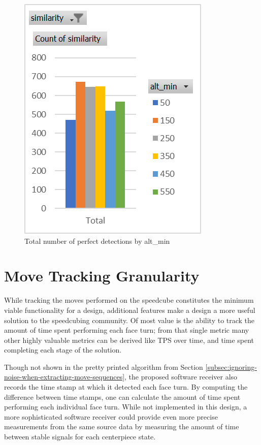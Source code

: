\begin{figure}[h]
    \centering
    \caption{Total number of perfect detections by alt\_min}
    \label{fig:perfect-detections-by-alt-min}
    \includegraphics[width=0.75\linewidth]{Figures/7 Evaluation/perfect_detections_by_alt_min.png}
\end{figure}


\section{Move Tracking Granularity}
\label{sec:move-tracking-granularity}

While tracking the moves performed on the speedcube constitutes the
minimum viable functionality for a design, additional features make a
design a more useful solution to the speedcubing community. Of most
value is the ability to track the amount of time spent performing each
face turn; from that single metric many other highly valuable metrics
can be derived like TPS over time, and time spent completing each stage
of the solution.

Though not shown in the pretty printed algorithm from Section
\ref{subsec:ignoring-noise-when-extracting-move-sequences}, the
proposed software receiver also records the time stamp at which it
detected each face turn. By computing the difference between time
stamps, one can calculate the amount of time spent performing each
individual face turn. While not implemented in this design, a more
sophisticated software receiver could provide even more precise
measurements from the same source data by measuring the amount of time
between stable signals for each centerpiece state.

